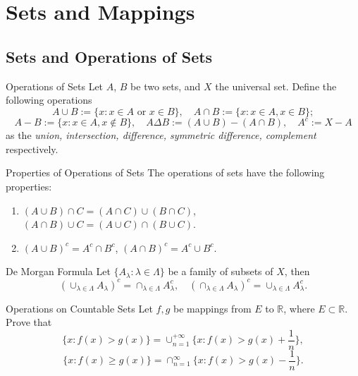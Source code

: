 
\section{Sets and Mappings}

\subsection{Sets and Operations of Sets}

\begin{definition}{Operations of Sets}{}
  Let $A$, $B$ be two sets,
  and $X$ the universal set.
  Define the following operations
  \begin{equation}
    A \cup B := \{x: x \in A \text{ or } x \in B\}, \quad
    A \cap B := \{x: x \in A, x \in B\};
  \end{equation}
  \begin{equation}
    A - B := \{x: x \in A, x \not\in B\}, \quad
    A \Delta B := (A \cup B) - (A \cap B), \quad
    A^c := X - A
  \end{equation}
  as the \emph{union, intersection, difference, symmetric difference, complement} respectively.
\end{definition}

\begin{proposition}{Properties of Operations of Sets}{}
  The operations of sets have the following properties:
  \begin{enumerate}
  \item $(A \cup B)\cap C = (A \cap C) \cup (B \cap C)$,
    $(A \cap B) \cup C = (A \cup C) \cap (B \cup C)$.
  \item $(A\cup B)^c = A^c \cap B^c$, $(A \cap B)^c = A^c \cup B^c$.
  \end{enumerate}
\end{proposition}

\begin{theorem}{De Morgan Formula}{}
  Let $\{A_{\lambda}: \lambda \in \Lambda\}$ be a family of subsets of $X$, then
  \begin{equation}
    \left(\cup_{\lambda\in\Lambda}A_{\lambda}\right)^{c}=\cap_{\lambda\in\Lambda}A_{\lambda}^{c},\quad\left(\cap_{\lambda\in\Lambda}A_{\lambda}\right)^{c}=\cup_{\lambda\in\Lambda}A_{\lambda}^{c}.
  \end{equation}
\end{theorem}

\begin{example}{Operations on Countable Sets}{}
  Let $f, g$ be mappings from $E$ to $\mathbb{R}$, where $E \subset \mathbb{R}$.
  Prove that
  \begin{equation}
    \{x: f(x) > g(x) \} = \cup _{n=1}^{+\infty} \{x: f(x) > g(x) + \frac{1}{n}\},
  \end{equation}
  \begin{equation}
    \{x: f(x) \geq g(x)\} = \cap _{n = 1}^{\infty} \{x: f(x) > g(x) - \frac{1}{n}\}.
  \end{equation}
\end{example}

